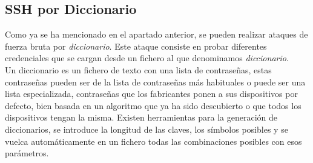 \documentclass[a4,12pt,onecolum]{article}
\begin{document}

\subsection{SSH por Diccionario}
Como ya se ha mencionado en el apartado anterior, se pueden realizar ataques de fuerza bruta por \emph{diccionario}. Este ataque consiste en probar diferentes credenciales que se cargan desde un fichero al que denominamos \emph{diccionario}. \\

Un diccionario es un fichero de texto con una lista de contraseñas, estas contraseñas pueden ser de la lista de contraseñas más habituales o puede ser una lista especializada, contraseñas que los fabricantes ponen a sus dispositivos por defecto, bien basada en un algoritmo que ya ha sido descubierto o que todos los dispositivos tengan la misma. Existen herramientas para la generación de diccionarios, se introduce la longitud de las claves, los símbolos posibles y se vuelca automáticamente en un fichero todas las combinaciones posibles con esos parámetros. \\
\end{document}
